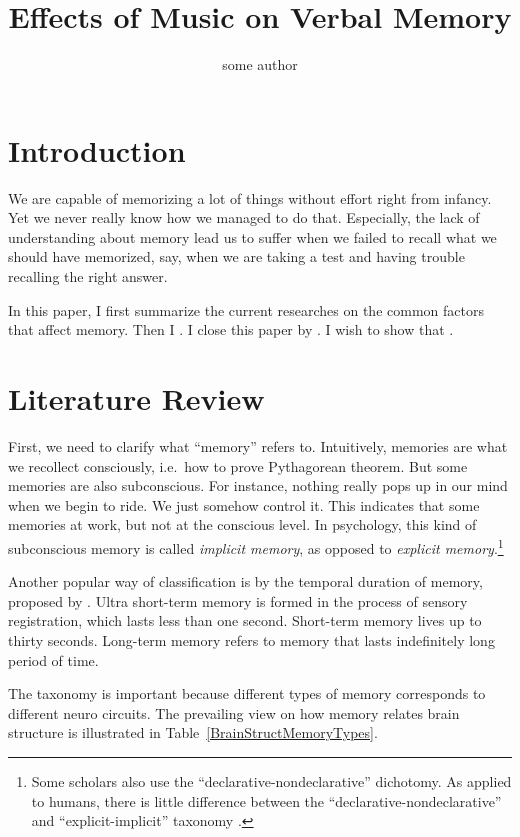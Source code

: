 \documentclass{article}
\title{Effects of Music on Verbal Memory}
\author{some author}
\begin{document}
\maketitle{}


\section{Introduction}

We are capable of memorizing a lot of things without effort right from infancy. Yet we never really know how we managed to do that. Especially, the lack of understanding about memory lead us to suffer when we failed to recall what we should have memorized, say, when we are taking a test and having trouble recalling the right answer. 

In this paper, I first summarize the current researches on the common factors that affect memory. Then I \hl{  }. I close this paper by \hl{  }. I wish to show that \hl{  }.

\section{Literature Review}

First, we need to clarify what ``memory'' refers to. Intuitively, memories are what we recollect consciously, i.e.\ how to prove Pythagorean theorem. But some memories are also subconscious. For instance, nothing really pops up in our mind when we begin to ride. We just somehow control it. This indicates that some memories at work, but not at the conscious level. In psychology, this kind of subconscious memory is called \textit{implicit memory}, as opposed to \textit{explicit memory}.\footnote{Some scholars also use the ``declarative-nondeclarative'' dichotomy. As applied to humans, there is little difference between the ``declarative-nondeclarative'' and ``explicit-implicit'' taxonomy \autocite[p.480]{kolbIntroductionBrainBehavior2019}.} 

Another popular way of classification is by the temporal duration of memory, proposed by \textcite{atkinsonHumanMemoryProposed1968}. Ultra short-term memory is formed in the process of sensory registration, which lasts less than one second. Short-term memory lives up to thirty seconds. Long-term memory refers to memory that lasts indefinitely long period of time. 

The taxonomy is important because different types of memory corresponds to different neuro circuits. The prevailing view on how memory relates brain structure is illustrated in Table~\ref{BrainStructMemoryTypes}. 
\end{document}
